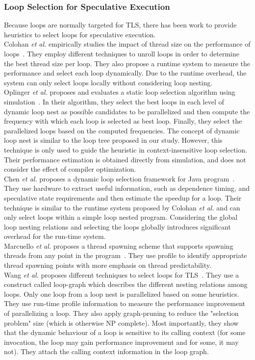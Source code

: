 \documentclass[10pt]{report}          %
\begin{document}
\subsubsection{Loop Selection for Speculative Execution}

Because loops are normally targeted for TLS, there has been work to provide heuristics to select loops for speculative execution.\\
Colohan \textit{et al.} empirically studies the impact of thread size on the performance of loops~\cite{colohan1}. They employ different techniques to unroll loops in order to determine the best thread size per loop. They also propose a runtime system to measure the performance and select each loop dynamically. Due to the runtime overhead, the system can only select loops locally without considering loop nesting.\\
Oplinger \textit{et al.} proposes and evaluates a static loop selection algorithm using simulation~\cite{olukotun}. In their algorithm, they select the best loops in each level of dynamic loop nest as possible candidates to be parallelized and then compute the frequency with which each loop is selected as best loop. Finally, they select the parallelized loops based on the computed frequencies. The concept of dynamic loop nest is similar to the loop tree proposed in our study. However, this technique is only used to guide the heuristic in context-insensitive loop selection. Their performance estimation is obtained directly from simulation, and does not consider the effect of compiler optimization.\\
Chen \textit{et al.} proposes a dynamic loop selection framework for Java program~\cite{chen1}. They use hardware to extract useful information, such as dependence timing, and speculative state requirements and then estimate the speedup for a loop. Their technique is similar to the runtime system proposed by Colohan \textit{et al.} and can only select loops within a simple loop nested program. Considering the global loop nesting relations and selecting the loops globally introduces significant overhead for the run-time system.\\
Marcuello \textit{et al.} proposes a thread spawning scheme that supports spawning threads from any point in the program~\cite{marcuello}. They use profile to identify appropriate thread spawning points with more emphasis on thread predictability.\\
Wang \textit{et al.} proposes different techniques to select loops for TLS~\cite{loopselection}.  They use a construct called loop-graph which describes the different nesting relations among loops.  Only one loop from a loop nest is parallelized based on some heuristics.  They use run-time profile information to measure the performance improvement of parallelizing a loop.  They also apply graph-pruning to reduce the "selection problem" size (which is otherwise NP complete).  Most importantly, they show that the dynamic behaviour of a loop is sensitive to its calling context (for some invocation, the loop may gain performance improvement and for some, it may not).  They attach the calling context information in the loop graph.
\end{document}
